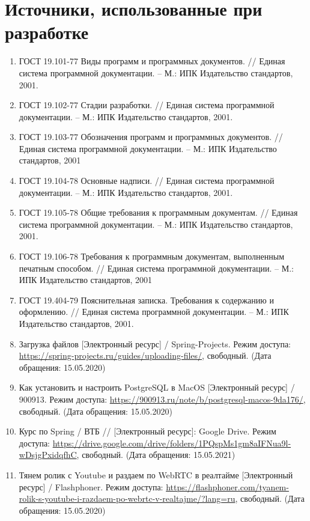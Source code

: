 \documentclass{../includes/TechDoc}
\begin{document}
    \clearpage


    \section{Источники, использованные при разработке}

    \begin{enumerate}
        \item ГОСТ 19.101-77 Виды программ и программных документов. // Единая система программной документации. – М.: ИПК Издательство стандартов, 2001.
        \item ГОСТ 19.102-77 Стадии разработки. // Единая система программной документации. – М.: ИПК Издательство стандартов, 2001.
        \item ГОСТ 19.103-77 Обозначения программ и программных документов. // Единая система программной документации. – М.: ИПК Издательство стандартов, 2001
        \item ГОСТ 19.104-78 Основные надписи. // Единая система программной документации. – М.: ИПК Издательство стандартов, 2001.
        \item ГОСТ 19.105-78 Общие требования к программным документам. // Единая система программной документации. – М.: ИПК Издательство стандартов, 2001.
        \item ГОСТ 19.106-78 Требования к программным документам, выполненным печатным способом. // Единая система программной документации. – М.: ИПК Издательство стандартов, 2001
        \item ГОСТ 19.404-79 Пояснительная записка. Требования к содержанию и оформлению. // Единая система программной документации. – М.: ИПК Издательство стандартов, 2001.
        \item Загрузка файлов [Электронный ресурс] / Spring-Projects. Режим доступа: \url{https://spring-projects.ru/guides/uploading-files/}, свободный. (Дата обращения: 15.05.2020)
        \item Как установить и настроить PostgreSQL в MacOS [Электронный ресурс] / 900913. Режим доступа: \url{https://900913.ru/note/b/postgresql-macos-9da176/}, свободный. (Дата обращения: 15.05.2020)
        \item Курс по Spring / ВТБ // [Электронный ресурс]: Google Drive. Режим доступа: \url{https://drive.google.com/drive/folders/1PQspMs1gm8aIFNua9l-wDsjgPxidqfhC}, свободный. (Дата обращения: 15.05.2021)
        \item Тянем ролик с Youtube и раздаем по WebRTC в реалтайме [Электронный ресурс] / Flashphoner. Режим доступа: \url{https://flashphoner.com/tyanem-rolik-s-youtube-i-razdaem-po-webrtc-v-realtajme/?lang=ru}, свободный. (Дата обращения: 15.05.2020)

\end{enumerate}
\end{document}
